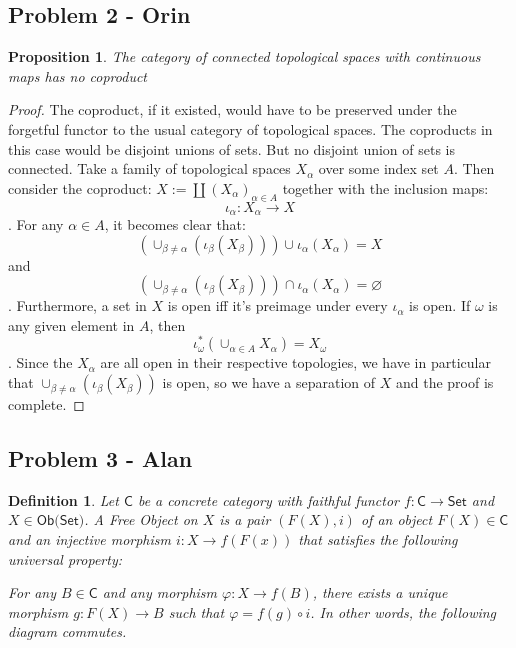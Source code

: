 \documentclass{article}
\newtheorem{proposition}[subsection]{Proposition}
\newtheorem{definition}[subsection]{Definition}
\begin{document}
\subsection{Problem 2 - Orin}
\begin{proposition}
	The category of connected topological spaces with continuous maps has no coproduct
\end{proposition}
\begin{proof}
	The coproduct, if it existed, would have to be preserved under the forgetful functor to the usual category of topological spaces.  The coproducts in this case would be disjoint unions of sets.  But no disjoint union of sets is connected.  Take a family of topological spaces $X_\alpha$ over some index set $A$.  Then consider the coproduct: $X := \coprod(X_\alpha)_{\alpha\in A}$ together with the inclusion maps: $$\iota_\alpha: X_\alpha\to X$$.  For any $\alpha\in A$, it becomes clear that:
	$$(\cup_{\beta\neq\alpha}(\iota_\beta(X_\beta)))\cup \iota_\alpha(X_\alpha) = X$$ and
	$$(\cup_{\beta\neq\alpha}(\iota_\beta(X_\beta)))\cap \iota_\alpha(X_\alpha) = \varnothing$$.  Furthermore, a set in $X$ is open iff it's preimage under every $\iota_\alpha$ is open.  If $\omega$ is any given element in $A$, then
	$$\iota_\omega^*(\cup_{\alpha\in A}X_\alpha)=X_\omega$$. Since the $X_\alpha$ are all open in their respective topologies, we have in particular that $\cup_{\beta\neq\alpha}(\iota_\beta(X_\beta))$ is open, so we have a separation of $X$ and the proof is complete.
\end{proof}
\subsection{Problem 3 - Alan}

\begin{definition}
	Let $\textsf{C}$ be a concrete category with faithful functor $f:\textsf{C} \xrightarrow{}\textsf{Set}$ and $X\in\textsf{Ob(Set)}$.
	A \textit{Free Object} on $X$ is a pair $(F(X),i)$ of an object $F(X)\in\textsf{C}$ and an injective morphism $i:X\xrightarrow{}f(F(x))$ that satisfies the following universal property:
	
	\vspace{2mm}
	
	For any $B\in\textsf{C}$ and any morphism $\varphi : X\xrightarrow{}f(B)$, there exists a unique morphism $g:F(X)\xrightarrow{}B$ such that $\varphi=f(g)\circ i$.
	In other words, the following diagram commutes.
\end{definition}
\end{document}
